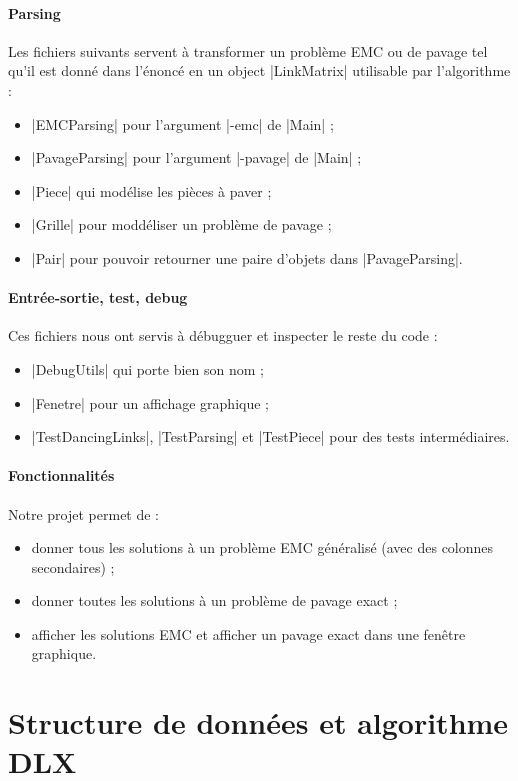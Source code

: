 \documentclass[11pt,french,a4paper]{article}
\begin{document}
\paragraph{Parsing} Les fichiers suivants servent à transformer un problème EMC ou de pavage tel qu'il est donné dans l'énoncé en un object |LinkMatrix| utilisable par l'algorithme :
\begin{itemize}
	\item |EMCParsing| pour l'argument |-emc| de |Main| ;
	\item |PavageParsing| pour l'argument |-pavage| de |Main| ;
	\item |Piece| qui modélise les pièces à paver ;
	\item |Grille| pour moddéliser un problème de pavage ;
	\item |Pair| pour pouvoir retourner une paire d'objets dans |PavageParsing|.
\end{itemize}

\paragraph{Entrée-sortie, test, debug} Ces fichiers nous ont servis à débugguer et inspecter le reste du code :
\begin{itemize}
	\item |DebugUtils| qui porte bien son nom ;
	\item |Fenetre| pour un affichage graphique ;
	\item |TestDancingLinks|, |TestParsing| et |TestPiece| pour des tests intermédiaires.
\end{itemize}

\paragraph{Fonctionnalités} Notre projet permet de :
\begin{itemize}
	\item donner tous les solutions à un problème EMC généralisé (avec des colonnes secondaires) ;
	\item donner toutes les solutions à un problème de pavage exact ;
	\item afficher les solutions EMC et afficher un pavage exact dans une fenêtre graphique.
\end{itemize}


\section{Structure de données et algorithme DLX}
\end{document}
